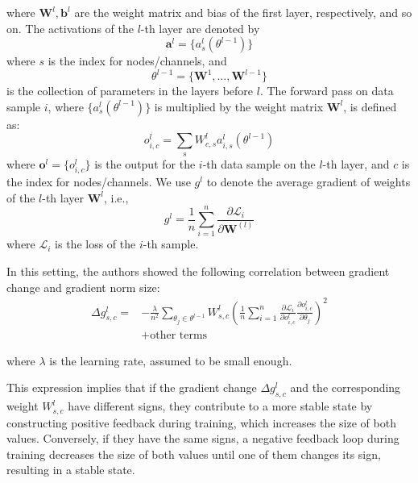 \documentclass{article}
\theoremstyle{plain}
\theoremstyle{definition}
\theoremstyle{remark}
\begin{document}
where $\bm{W}^{l}, \bm{b}^{l}$ are the weight matrix and bias of the first layer, respectively, and so on. The activations of the $l$-th layer are denoted by 
\begin{equation}
\bm{a}^{l} = \{ a_s^{l}(\theta^{l-1}) \}
\end{equation}
where $s$ is the index for nodes/channels, and 
\begin{equation}
\theta^{l-1} = \{ \bm{W}^{1}, \ldots, \bm{W}^{l-1} \}
\end{equation}
is the collection of parameters in the layers before $l$. The forward pass on data sample $i$, where $\{ a_s^{l}(\theta^{l-1}) \}$ is multiplied by the weight matrix $\bm{W}^{l}$, is defined as:
\begin{equation}
o_{i,c}^{l} = \sum_s W_{c,s}^{l} a_{i,s}^{l}(\theta^{l-1})
\end{equation}
where $\bm{o}^{l} = \{ o_{i,c}^{l} \}$ is the output for the $i$-th data sample on the $l$-th layer, and $c$ is the index for nodes/channels. We use $g^{l}$ to denote the average gradient of weights of the $l$-th layer $\bm{W}^{l}$, i.e.,
\begin{equation}
g^{l} = \frac{1}{n} \sum_{i=1}^{n} \frac{\partial \mathcal{L}_i}{\partial \bm{W}^{(l)}}
\end{equation}
where $\mathcal{L}_i$ is the loss of the $i$-th sample.

In this setting, the authors showed the following correlation between gradient change and gradient norm size:
\begin{equation}
\begin{aligned}
\Delta g_{s,c}^{l} = 
& -\frac{\lambda}{n^2} \sum_{\theta_j \in \theta^{l-1}} W_{s,c}^{l} 
\left( \frac{1}{n} \sum_{i=1}^n \frac{\partial \mathcal{L}_i}{\partial o_{i,c}^{l}} \frac{\partial o_{i,c}^{l}}{\partial \theta_j} \right)^2 \\
& + \text{other terms}
\end{aligned}
\end{equation}

where $\lambda$ is the learning rate, assumed to be small enough.

This expression implies that if the gradient change $\Delta g_{s,c}^{l}$ and the corresponding weight $W_{s,c}^{l}$ have different signs, they contribute to a more stable state by constructing positive feedback during training, which increases the size of both values. Conversely, if they have the same signs, a negative feedback loop during training decreases the size of both values until one of them changes its sign, resulting in a stable state.
\end{document}
